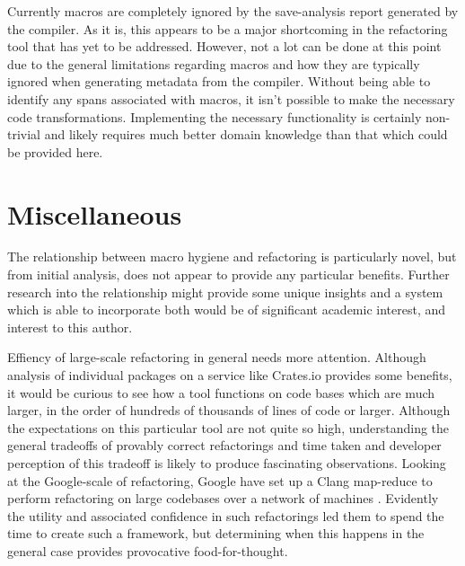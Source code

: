 
Currently macros are completely ignored by the save-analysis report generated by the compiler. As it is, this appears to be a major shortcoming in the refactoring tool that has yet to be addressed. However, not a lot can be done at this point due to the general limitations regarding macros and how they are typically ignored when generating metadata from the compiler. Without being able to identify any spans associated with macros, it isn't possible to make the necessary code transformations. Implementing the necessary functionality is certainly non-trivial and likely requires much better domain knowledge than that which could be provided here.

\section{Miscellaneous}


The relationship between macro hygiene and refactoring is particularly novel, but from initial analysis, does not appear to provide any particular benefits. Further research into the relationship might provide some unique insights and a system which is able to incorporate both would be of significant academic interest, and interest to this author.

Effiency of large-scale refactoring in general needs more attention. Although analysis of individual packages on a service like Crates.io provides some benefits, it would be curious to see how a tool functions on code bases which are much larger, in the order of hundreds of thousands of lines of code or larger. Although the expectations on this particular tool are not quite so high, understanding the general tradeoffs of provably correct refactorings and time taken and developer perception of this tradeoff is likely to produce fascinating observations. Looking at the Google-scale of refactoring, Google have set up a Clang map-reduce to perform refactoring on large codebases over a network of machines \cite{carruth2011clang}. Evidently the utility and associated confidence in such refactorings led them to spend the time to create such a framework, but determining when this happens in the general case provides provocative food-for-thought.

